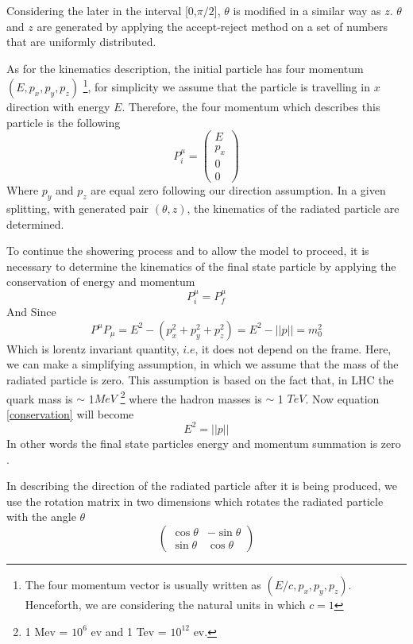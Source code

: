 Considering the later in the interval [0,$\pi/2$], $\theta$ is modified in a similar way as $z$. $\theta$ and $z$ are generated by applying the accept-reject method on a set of numbers that are uniformly distributed.

As for the kinematics description, the initial particle has four momentum $(E, p_{x}, p_{y},p_{z})$ \footnote{The four momentum vector is usually written as $(E/c, p_{x}, p_{y},p_{z})$. Henceforth, we are considering the natural units in which $c = 1$}, for simplicity we assume that the particle is travelling in $x$ direction with energy $E$. Therefore, the four momentum which describes this particle is the following 
\begin{equation}
P^{\mu}_{i}  = \begin{pmatrix}
E\\
p_x\\
0\\
0
\end{pmatrix}
\end{equation}
Where $p_y$ and $p_z$ are equal zero following our direction assumption. In a given splitting, with generated pair $(\theta, z)$, the kinematics of the radiated particle are determined.

To continue the showering process and to allow the model to proceed, it is necessary to determine the kinematics of the final state particle by applying the conservation of energy and momentum 
\begin{equation}
P_i^{\mu} = P_f^{\mu}
\end{equation} 
And Since \begin{equation}\label{conservation}
P^{\mu} P_{\mu} = E^2 - (p_x^2 + p_y^2 + p_z^2) = E^2 - ||p|| = m_0^2
\end{equation} Which is lorentz invariant quantity, $i.e$, it does not depend on the frame. Here, we can make a simplifying assumption, in which we assume that the mass of the radiated particle is zero. This assumption is based on the fact that, in LHC the quark mass is $\sim$ 1$\si{MeV}$ \footnote{1 Mev = $10^6$ ev and 1 Tev = $10^12$ ev.} where the hadron masses is $\sim$ 1 $\si{TeV}$. Now equation \ref{conservation} will become \begin{equation}\label{important}
E^2 = ||p||
\end{equation} In other words the final state particles energy and momentum summation is zero \citep{Salam:2010zt}.    
  
In  describing the direction of the radiated particle after it is being produced, we use the rotation matrix in two dimensions which rotates the radiated particle with the angle $\theta$ 
\begin{equation}
\begin{pmatrix}
\cos \theta & - \sin \theta\\
\sin \theta & \cos \theta
\end{pmatrix}
\end{equation}   

